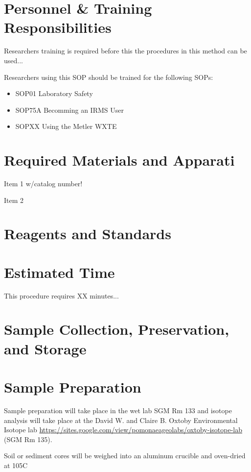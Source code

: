 \documentclass[12pt]{../SOP3}\usepackage[]{graphicx}\usepackage[]{color}
\begin{document}
\section{Personnel \& Training Responsibilities}

\NP Researchers training is required before this the procedures in this method can be used... 

\NP Researchers using this SOP should be trained for the following SOPs:

\begin{itemize}
  \item SOP01 Laboratory Safety
  \item SOP75A Becomming an IRMS User
  \item SOPXX Using the Metler WXTE
\end{itemize}

\section{Required Materials and Apparati}

\NP Item 1 w/catalog number!

\NP Item 2

\section{Reagents and Standards}

\section{Estimated Time}

\NP This procedure requires XX minutes...

\section{Sample Collection, Preservation, and Storage}


\section{Sample Preparation}

\NP Sample preparation will take place in the wet lab SGM Rm 133 and isotope analysis will take place at the David W. and Claire B. Oxtoby Environmental Isotope lab \url{https://sites.google.com/view/pomonaeageolabs/oxtoby-isotope-lab} (SGM Rm 135).

\NP Soil or sediment cores will be weighed into an aluminum crucible and oven-dried at 105\degree C
\end{document}
